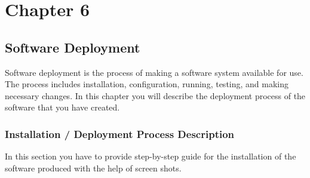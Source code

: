 


\setcounter{chapter}{6}
\setcounter{figure}{0}
\setcounter{table}{0}
\chapter*{Chapter 6}
\section{Software Deployment}
Software deployment is the process of making a software system available for use. The process includes installation, configuration, running, testing, and making necessary changes. In this chapter you will describe the deployment process of the software that you have created.
\subsection{Installation / Deployment Process Description}
In this section you have to provide step-by-step guide for the installation of the software produced with the help of screen shots.


